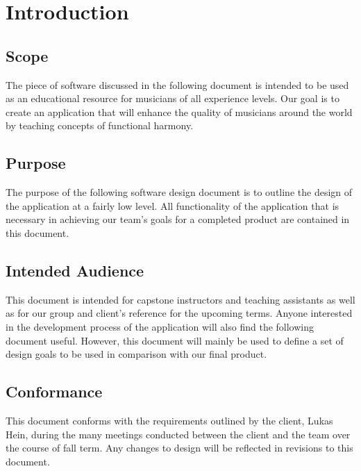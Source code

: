 \documentclass[onecolumn, draftclsnofoot,10pt, compsoc]{IEEEtran}
\begin{document}
\section{Introduction}
\subsection{Scope}
The piece of software discussed in the following document is intended to be used as an educational resource for musicians of all experience levels. 
Our goal is to create an application that will enhance the quality of musicians around the world by teaching concepts of functional harmony.

\subsection{Purpose}
The purpose of the following software design document is to outline the design of the application at a fairly low level.
All functionality of the application that is necessary in achieving our team’s goals for a completed product are contained in this document.		

\subsection{Intended Audience}
This document is intended for capstone instructors and teaching assistants as well as for our group and client’s reference for the upcoming terms. 
Anyone interested in the development process of the application will also find the following document useful. 
However, this document will mainly be used to define a set of design goals to be used in comparison with our final product.		

\subsection{Conformance}
This document conforms with the requirements outlined by the client, Lukas Hein, during the many meetings conducted between the client and the team over the course of fall term. 
Any changes to design will be reflected in revisions to this document.
\end{document}
